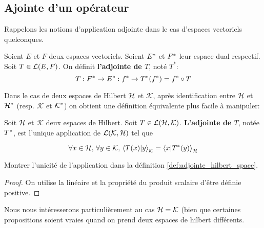 \subsection{Ajointe d'un opérateur}

Rappelons les notions d'application adjointe dans le cas d'espaces vectoriels
quelconques.

\begin{definition}
	\label{def:adjointe_dual_space}
	Soient $E$ et $F$ deux espaces vectoriels. Soient $E^{*}$ et
	$F^{*}$ leur espace dual respectif.
	Soit $T \in \mathcal{L}(E, F)$. On définit \textbf{l'adjointe de $T$},
	noté $T^{*}$:
	\begin{equation}
		T : F^{*} \rightarrow E^{*} : f^{*} \rightarrow T^{*}(f^{*})
	= f^{*} \circ T
		\label{def:adjointe_operator}
	\end{equation}
\end{definition}

Dans le cas de deux espaces de Hilbert $\mathcal{H}$ et $\mathcal{K}$, après
identification entre $\mathcal{H}$ et $\mathcal{H}^{*}$ (resp. $\mathcal{K}$ et
$\mathcal{K}^{*}$) on obtient une définition équivalente plus facile à
manipuler:

\begin{definition}
	\label{def:adjointe_hilbert_space}
	Soit $\mathcal{H}$ et $\mathcal{K}$ deux espaces de Hilbert.
	Soit $T \in \mathcal{L}(\mathcal{H}, \mathcal{K})$.
	\textbf{L'adjointe de $T$}, notée $T^{*}$, est l'unique application
	de $\mathcal{L}(\mathcal{K}, \mathcal{H})$ tel que

	\begin{equation}
		\forall x \in \mathcal{H}, \, \forall y \in \mathcal{K}, \,
		{\bra{T(x)}\ket{y}}_{\mathcal{K}} = {\bra{x}\ket{T^{*}(y)}}_{\mathcal{H}}
	\end{equation}
\end{definition}

\begin{proposition}
	Montrer l'unicité de l'application dans la définition
	\ref{def:adjointe_hilbert_space}.
\end{proposition}

\begin{proof}
	On utilise la linéaire et la propriété du produit scalaire d'être définie
	positive.
\end{proof}

Nous nous intéresserons particulièrement au cas $\mathcal{H} = \mathcal{K}$ (bien
que certaines propositions soient vraies quand on prend deux espaces de hilbert
différents.

